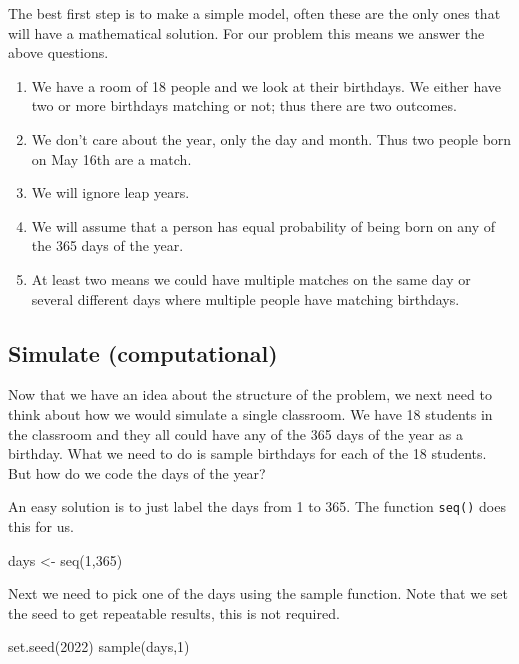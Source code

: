 \documentclass[
]{book}
\newenvironment{Shaded}{\begin{snugshade}}{\end{snugshade}}
\newcommand{\DecValTok}[1]{\textcolor[rgb]{0.00,0.00,0.81}{#1}}
\newcommand{\FunctionTok}[1]{\textcolor[rgb]{0.00,0.00,0.00}{#1}}
\newcommand{\NormalTok}[1]{#1}
\newcommand{\OtherTok}[1]{\textcolor[rgb]{0.56,0.35,0.01}{#1}}
\providecommand{\tightlist}{%
  \setlength{\itemsep}{0pt}\setlength{\parskip}{0pt}}
\begin{document}
The best first step is to make a simple model, often these are the only ones that will have a mathematical solution. For our problem this means we answer the above questions.

\begin{enumerate}
\def\labelenumi{\arabic{enumi}.}
\tightlist
\item
  We have a room of 18 people and we look at their birthdays. We either have two or more birthdays matching or not; thus there are two outcomes.
\item
  We don't care about the year, only the day and month. Thus two people born on May 16th are a match.
\item
  We will ignore leap years.
\item
  We will assume that a person has equal probability of being born on any of the 365 days of the year.
\item
  At least two means we could have multiple matches on the same day or several different days where multiple people have matching birthdays.
\end{enumerate}

\hypertarget{simulate-computational}{%
\subsection{Simulate (computational)}\label{simulate-computational}}

Now that we have an idea about the structure of the problem, we next need to think about how we would simulate a single classroom. We have 18 students in the classroom and they all could have any of the 365 days of the year as a birthday. What we need to do is sample birthdays for each of the 18 students. But how do we code the days of the year?

An easy solution is to just label the days from 1 to 365. The function \texttt{seq()} does this for us.

\begin{Shaded}
\begin{Highlighting}[]
\NormalTok{days }\OtherTok{\textless{}{-}} \FunctionTok{seq}\NormalTok{(}\DecValTok{1}\NormalTok{,}\DecValTok{365}\NormalTok{)}
\end{Highlighting}
\end{Shaded}

Next we need to pick one of the days using the sample function. Note that we set the seed to get repeatable results, this is not required.

\begin{Shaded}
\begin{Highlighting}[]
\FunctionTok{set.seed}\NormalTok{(}\DecValTok{2022}\NormalTok{)}
\FunctionTok{sample}\NormalTok{(days,}\DecValTok{1}\NormalTok{)}
\end{Highlighting}
\end{Shaded}
\end{document}
